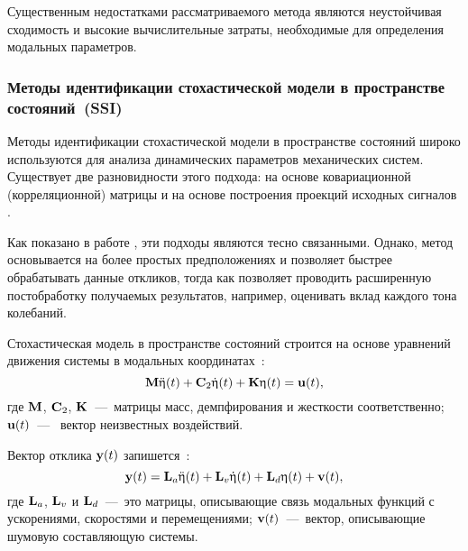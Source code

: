 Существенным недостатками рассматриваемого метода являются неустойчивая сходимость и высокие вычислительные затраты, необходимые для определения модальных параметров.

\subsubsection{Методы идентификации стохастической модели в пространстве состояний~(SSI)}

Методы идентификации стохастической модели в пространстве состояний широко используются для анализа динамических параметров механических систем. Существует две разновидности этого подхода: на основе ковариационной (корреляционной) матрицы  и на основе построения проекций исходных сигналов  \cite{lib:oma:Rainieri}. 

Как показано в работе \cite{lib:oma:Peeters}, эти подходы являются тесно связанными. Однако, метод  основывается на более простых предположениях и позволяет быстрее обрабатывать данные откликов, тогда как  позволяет проводить расширенную постобработку получаемых результатов, например, оценивать вклад каждого тона колебаний.

Стохастическая модель в пространстве состояний строится на основе уравнений движения системы в модальных координатах~\cite{lib:oma:Reynders}:
\begin{equation}
	\mathbf{M} \ddot{\mathbf{\upeta}}(t) + \mathbf{C}_2 \dot{\mathbf{\upeta}}(t) + \mathbf{K} \upeta(t) = \mathbf{u}(t),
\end{equation}
где $ \mathbf{M} $, $ \mathbf{C}_2 $, $ \mathbf{K} $~---~матрицы масс, демпфирования и жесткости соответственно; $ \mathbf{u}(t) $~---~ вектор неизвестных воздействий. 

Вектор отклика $ \mathbf{y}(t) $ запишется~\cite{lib:oma:Nilsson}:
\begin{equation}
	\mathbf{y}(t) = \mathbf{L}_a \ddot{\mathbf{\upeta}}(t) + \mathbf{L}_v \dot{\mathbf{\upeta}}(t) + \mathbf{L}_d \upeta(t) + \mathbf{v}(t),
\end{equation}
где $ \mathbf{L}_a $, $ \mathbf{L}_v $ и $ \mathbf{L}_d $~---~это матрицы, описывающие связь модальных функций с ускорениями, скоростями и перемещениями; $ \mathbf{v}(t) $~---~вектор, описывающие шумовую составляющую системы. 

